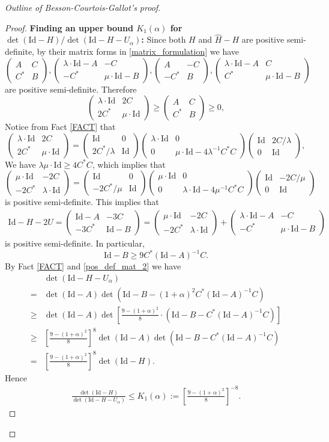 \documentclass{article}
\newcommand{\id}{\mathrm{Id}}
\newcommand{\matii}[2]{\left(\begin{array}{cc} #1\\#2\end{array}\right)}
\theoremstyle{definition}
\begin{document}
\begin{proof}[Outline of Besson-Courtois-Gallot's proof]
\begin{proof}
\textbf{Finding an upper bound $K_1(\alpha)$ for $\det(\id-H)/\det(\id-H-U_\alpha)$:} Since both $H$ and $\widehat H-H$ are positive semi-definite, by their matrix forms in \eqref{matrix_formulation} we have
$$\matii{A&C}{C^*&B},\matii{\lambda\cdot\id-A&-C}{-C^*&\mu\cdot\id-B},\matii{A&-C}{-C^*&B},\matii{\lambda\cdot\id-A&C}{C^*&\mu\cdot\id-B}$$
are positive semi-definite.
Therefore
$$\matii{\lambda\cdot\id& 2C}{2C^*&\mu\cdot\id}\geq \matii{A&C}{C^*&B}\geq 0,$$
Notice from Fact \ref{FACT} that 
$$\matii{\lambda\cdot\id& 2C}{2C^*&\mu\cdot\id}=\matii{\id&0}{2C^*/\lambda&\id}\matii{\lambda\cdot\id&0}{0&\mu\cdot\id-4\lambda^{-1}C^*C}\matii{\id&2C/\lambda}{0&\id},$$
We have $\lambda\mu\cdot\id\geq 4C^*C$, which implies that
$$\matii{\mu\cdot\id& -2C}{-2C^*&\lambda\cdot\id}=\matii{\id&0}{-2C^*/\mu&\id}\matii{\mu\cdot\id&0}{0&\lambda\cdot\id-4\mu^{-1}C^*C}\matii{\id&-2C/\mu}{0&\id}$$
is positive semi-definite. This implies that
\begin{align}\label{pos_def_mat_2}
\id-H-2U=\matii{\id-A&-3C}{-3C^*&\id-B}=\matii{\mu\cdot\id& -2C}{-2C^*&\lambda\cdot\id}+\matii{\lambda\cdot\id-A&-C}{-C^*&\mu\cdot\id-B}
\end{align}
is positive semi-definite. In particular,
$$\id-B\geq9C^*(\id-A)^{-1}C.$$
By Fact \ref{FACT} and \eqref{pos_def_mat_2} we have
\begin{align*}
&\det(\id-H-U_\alpha)\\
=&\det(\id-A)\det(\id-B-(1+\alpha)^2C^*(\id-A)^{-1}C)\\
\geq&\det(\id-A)\det\left[\frac{9-(1+\alpha)^2}{8}\cdot\left(\id-B-C^*(\id-A)^{-1}C\right)\right]\\
\geq&\left[\frac{9-(1+\alpha)^2}{8}\right]^8\det(\id-A)\det(\id-B-C^*(\id-A)^{-1}C)\\
=&\left[\frac{9-(1+\alpha)^2}{8}\right]^8\det(\id-H).
\end{align*}
Hence
\begin{align}\label{K_1}
\frac{\det(\id-H)}{\det(\id-H-U_\alpha)}\leq K_1(\alpha):=\left[\frac{9-(1+\alpha)^2}{8}\right]^{-8}.
\end{align}


\end{proof}
\end{proof}
\end{document}

